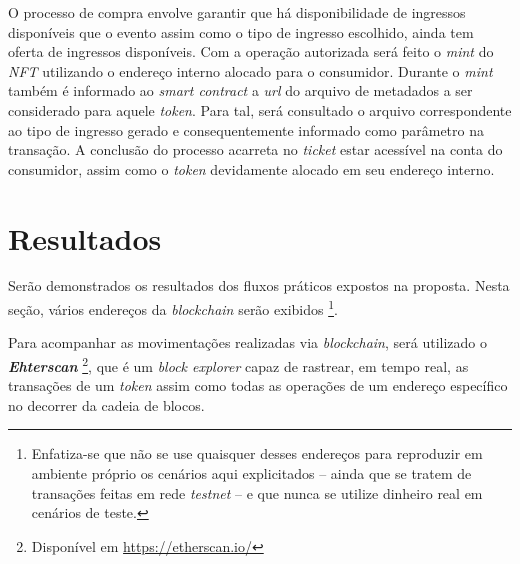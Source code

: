 {O processo de compra envolve garantir que há disponibilidade de ingressos disponíveis que o evento assim como o tipo de ingresso escolhido, ainda tem oferta de ingressos disponíveis. Com a operação autorizada será feito o \textit{mint} do \textit{NFT} utilizando o endereço interno alocado para o consumidor. Durante o \textit{mint} também é informado ao \textit{smart contract} a \textit{url} do arquivo de metadados a ser considerado para aquele \textit{token}. Para tal, será consultado o arquivo correspondente ao tipo de ingresso gerado e consequentemente informado como parâmetro na transação. A conclusão do processo acarreta no \textit{ticket} estar acessível na conta do consumidor, assim como o \textit{token} devidamente alocado em seu endereço interno.


\section{\esp Resultados}
Serão demonstrados os resultados dos fluxos práticos expostos na proposta. Nesta seção, vários endereços da \textit{blockchain} serão exibidos \footnote{Enfatiza-se que não se use quaisquer desses endereços para reproduzir em ambiente próprio os cenários aqui explicitados -- ainda que se tratem de transações feitas em rede \textit{testnet} -- e que nunca se utilize dinheiro real em cenários de teste.}.

Para acompanhar as movimentações realizadas via \textit{blockchain}, será utilizado o \textit{\textbf{Ehterscan}} \footnote{Disponível em \url{https://etherscan.io/}}, que é um \textit{block explorer} capaz de rastrear, em tempo real, as transações de um \textit{token} assim como todas as operações de um endereço específico no decorrer da cadeia de blocos.

}
